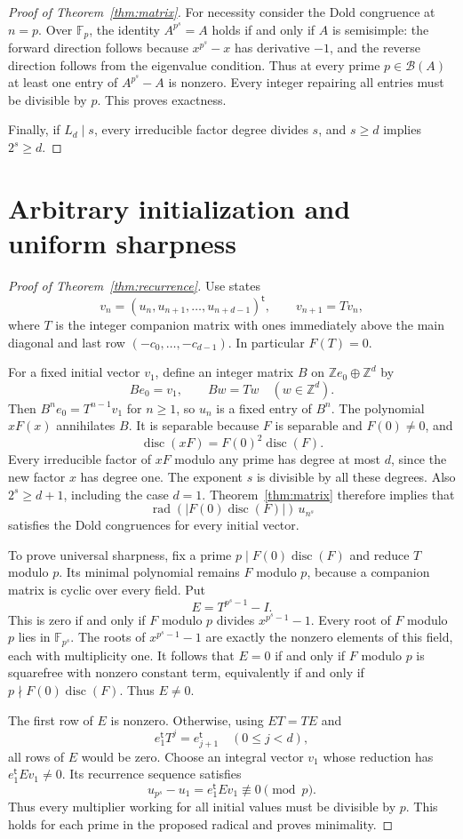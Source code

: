 \documentclass[11pt]{article}
\theoremstyle{remark}
\newcommand{\rad}{\operatorname{rad}}
\newcommand{\disc}{\operatorname{disc}}
\begin{document}
\begin{proof}[Proof of Theorem~\ref{thm:matrix}]
For necessity consider the Dold congruence at $n=p$. Over $\mathbb F_p$, the identity $A^{p^s}=A$ holds if and only if $A$ is semisimple: the forward direction follows because $x^{p^s}-x$ has derivative $-1$, and the reverse direction follows from the eigenvalue condition. Thus at every prime $p\in\mathcal B(A)$ at least one entry of $A^{p^s}-A$ is nonzero. Every integer repairing all entries must be divisible by $p$. This proves exactness.

Finally, if $L_d\mid s$, every irreducible factor degree divides $s$, and $s\geq d$ implies $2^s\geq d$.
\end{proof}

\section{Arbitrary initialization and uniform sharpness}

\begin{proof}[Proof of Theorem~\ref{thm:recurrence}]
Use states
\[
 v_n=(u_n,u_{n+1},\ldots,u_{n+d-1})^{\mathsf t},\qquad
 v_{n+1}=Tv_n,
\]
where $T$ is the integer companion matrix with ones immediately above the main diagonal and last row $(-c_0,\ldots,-c_{d-1})$. In particular $F(T)=0$.

For a fixed initial vector $v_1$, define an integer matrix $B$ on $\mathbb Z e_0\oplus\mathbb Z^d$ by
\[
 Be_0=v_1,\qquad Bw=Tw\quad(w\in\mathbb Z^d).
\]
Then $B^n e_0=T^{n-1}v_1$ for $n\geq1$, so $u_n$ is a fixed entry of $B^n$. The polynomial $xF(x)$ annihilates $B$. It is separable because $F$ is separable and $F(0)\neq0$, and
\[
 \disc(xF)=F(0)^2\disc(F).
\]
Every irreducible factor of $xF$ modulo any prime has degree at most $d$, since the new factor $x$ has degree one. The exponent $s$ is divisible by all these degrees. Also $2^s\geq d+1$, including the case $d=1$. Theorem~\ref{thm:matrix} therefore implies that
\[
 \rad(|F(0)\disc(F)|)\,u_{n^s}
\]
satisfies the Dold congruences for every initial vector.

To prove universal sharpness, fix a prime $p\mid F(0)\disc(F)$ and reduce $T$ modulo $p$. Its minimal polynomial remains $F$ modulo $p$, because a companion matrix is cyclic over every field. Put
\[
 E=T^{p^s-1}-I.
\]
This is zero if and only if $F$ modulo $p$ divides $x^{p^s-1}-1$. Every root of $F$ modulo $p$ lies in $\mathbb F_{p^s}$. The roots of $x^{p^s-1}-1$ are exactly the nonzero elements of this field, each with multiplicity one. It follows that $E=0$ if and only if $F$ modulo $p$ is squarefree with nonzero constant term, equivalently if and only if $p\nmid F(0)\disc(F)$. Thus $E\neq0$.

The first row of $E$ is nonzero. Otherwise, using $ET=TE$ and
\[
 e_1^{\mathsf t}T^j=e_{j+1}^{\mathsf t}\quad(0\leq j<d),
\]
all rows of $E$ would be zero. Choose an integral vector $v_1$ whose reduction has $e_1^{\mathsf t}Ev_1\neq0$. Its recurrence sequence satisfies
\[
 u_{p^s}-u_1=e_1^{\mathsf t}Ev_1\not\equiv0\pmod p.
\]
Thus every multiplier working for all initial values must be divisible by $p$. This holds for each prime in the proposed radical and proves minimality.
\end{proof}
\end{document}
